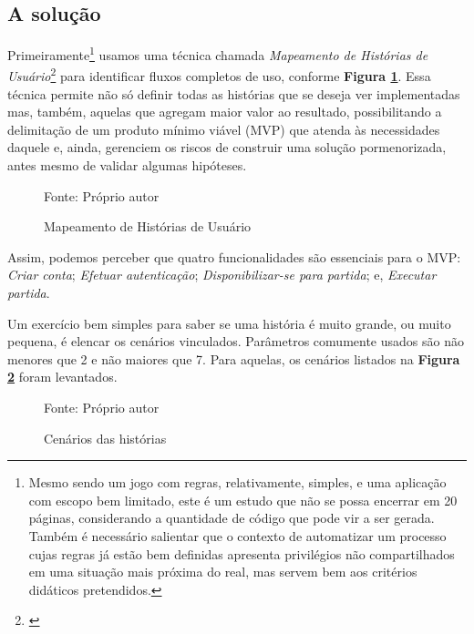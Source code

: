 \subsection{A solução}

  Primeiramente\footnote{Mesmo sendo um jogo com regras, relativamente,
  simples, e uma aplicação com escopo bem limitado, este é um estudo que não
  se possa encerrar em 20 páginas, considerando a quantidade de código que
  pode vir a ser gerada. Também é necessário salientar que o contexto de
  automatizar um processo cujas regras já estão bem definidas apresenta
  privilégios não compartilhados em uma situação mais próxima do real, mas
  servem bem aos critérios didáticos pretendidos.}
  usamos uma técnica chamada
  \emph{Mapeamento de Histórias de Usuário}\footnote{\cite{Patton2014}}
  para identificar fluxos completos de uso, conforme
  \textbf{Figura \ref{fig:fluxogeral}}. Essa técnica permite não só definir
  todas as histórias que se deseja ver implementadas mas, também, aquelas
  que agregam maior valor ao resultado, possibilitando a delimitação de um
  produto mínimo viável (MVP) que atenda às necessidades daquele e, ainda,
  gerenciem os riscos de construir uma solução pormenorizada, antes mesmo de
  validar algumas hipóteses.

  \begin{figure}[h]
    \centering
    \caption{Mapeamento de Histórias de Usuário}
    Fonte: Próprio autor\footnotemark
    \label{fig:fluxogeral}
  \end{figure}

  Assim, podemos perceber que quatro funcionalidades são essenciais para o
  MVP: \emph{Criar conta}; \emph{Efetuar autenticação};
  \emph{Disponibilizar-se para partida}; e, \emph{Executar partida}.

  Um exercício bem simples para saber se uma história é muito grande, ou
  muito pequena, é elencar os cenários vinculados. Parâmetros comumente
  usados são não menores que 2 e não maiores que 7. Para aquelas, os
  cenários listados na \textbf{Figura \ref{fig:cenarios-das-historias}}
  foram levantados.

  \begin{figure}[h]
    \centering
    \caption{Cenários das histórias}
    
    Fonte: Próprio autor
    \label{fig:cenarios-das-historias}
  \end{figure}

